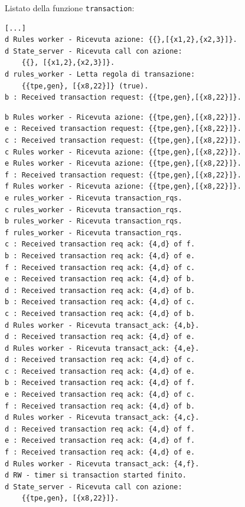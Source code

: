 \documentclass[italian]{memoir}
\begin{document}
Listato della funzione \texttt{transaction}:
\begin{tcolorbox}[colback=yellow!5!white,colframe=cyan!75!black,title=funzione \texttt{transaction} (1)]
\begin{center}
\begin{verbatim}
[...]
d Rules worker - Ricevuta azione: {{},[{x1,2},{x2,3}]}.
d State_server - Ricevuta call con azione: 
    {{}, [{x1,2},{x2,3}]}.
d rules_worker - Letta regola di transazione: 
    {{tpe,gen}, [{x8,22}]} (true).
b : Received transaction request: {{tpe,gen},[{x8,22}]}.
\end{verbatim}
\end{center}
\end{tcolorbox}
\begin{tcolorbox}[colback=yellow!5!white,colframe=cyan!75!black,title=funzione \texttt{transaction} (2)]
\begin{center}
\begin{verbatim}
b Rules worker - Ricevuta azione: {{tpe,gen},[{x8,22}]}.
e : Received transaction request: {{tpe,gen},[{x8,22}]}.
c : Received transaction request: {{tpe,gen},[{x8,22}]}.
c Rules worker - Ricevuta azione: {{tpe,gen},[{x8,22}]}.
e Rules worker - Ricevuta azione: {{tpe,gen},[{x8,22}]}.
f : Received transaction request: {{tpe,gen},[{x8,22}]}.
f Rules worker - Ricevuta azione: {{tpe,gen},[{x8,22}]}.
e rules_worker - Ricevuta transaction_rqs.
c rules_worker - Ricevuta transaction_rqs.
b rules_worker - Ricevuta transaction_rqs.
f rules_worker - Ricevuta transaction_rqs.
c : Received transaction req ack: {4,d} of f.
b : Received transaction req ack: {4,d} of e.
f : Received transaction req ack: {4,d} of c.
e : Received transaction req ack: {4,d} of b.
d : Received transaction req ack: {4,d} of b.
b : Received transaction req ack: {4,d} of c.
c : Received transaction req ack: {4,d} of b.
d Rules worker - Ricevuta transact_ack: {4,b}.
d : Received transaction req ack: {4,d} of e.
d Rules worker - Ricevuta transact_ack: {4,e}.
d : Received transaction req ack: {4,d} of c.
c : Received transaction req ack: {4,d} of e.
b : Received transaction req ack: {4,d} of f.
e : Received transaction req ack: {4,d} of c.
f : Received transaction req ack: {4,d} of b.
d Rules worker - Ricevuta transact_ack: {4,c}.
d : Received transaction req ack: {4,d} of f.
e : Received transaction req ack: {4,d} of f.
f : Received transaction req ack: {4,d} of e.
d Rules worker - Ricevuta transact_ack: {4,f}.
d RW - timer si transaction started finito.
d State_server - Ricevuta call con azione:
    {{tpe,gen}, [{x8,22}]}.

\end{verbatim}
\end{center}
\end{tcolorbox}
\end{document}
